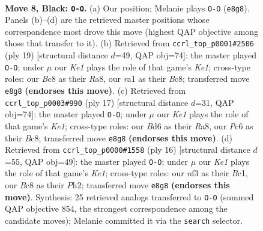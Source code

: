 \documentclass[11pt]{article}
\begin{document}
\begin{figure}[p]\centering
\begin{subfigure}{0.46\textwidth}\centering
\resizebox{\linewidth}{!}{%
\newchessgame
\chessboard[
  setfen={rnbqk2r/pp4pp/2pb1n2/3p1pB1/3P4/5NP1/PP2PPBP/RN1Q1RK1 b kq - 1 8},
  showmover=false,
  pgfstyle=straightmove, color=movearrow, markmove={e8-g8}
]}
\caption{}
\end{subfigure}\hfill
\begin{subfigure}{0.46\textwidth}\centering
\resizebox{\linewidth}{!}{%
\newchessgame
\chessboard[
  setfen={r1bqk2r/1p3ppp/p1n2n2/2bp2B1/8/P4NP1/1PP2PBP/RN1Q1RK1 b kq - 1 10},
  showmover=false,
  pgfstyle=straightmove, color=movearrow, markmove={e8-g8}
]}
\caption{}
\end{subfigure}
\\[4pt]
\begin{subfigure}{0.46\textwidth}\centering
\resizebox{\linewidth}{!}{%
\newchessgame
\chessboard[
  setfen={r1bqk2r/pp3ppp/2nbpn2/6B1/2Pp4/3P1NP1/PP3PBP/RN1Q1RK1 b kq - 2 9},
  showmover=false,
  pgfstyle=straightmove, color=movearrow, markmove={e8-g8}
]}
\caption{}
\end{subfigure}\hfill
\begin{subfigure}{0.46\textwidth}\centering
\resizebox{\linewidth}{!}{%
\newchessgame
\chessboard[
  setfen={rnbq1rk1/pp3ppp/5n2/3p4/1b1P4/2NB1N2/PP3PPP/R1BQK2R w KQ - 2 9},
  showmover=false,
  pgfstyle=straightmove, color=movearrow, markmove={e1-g1}
]}
\caption{}
\end{subfigure}
\caption{\textbf{Move 8, Black: \texttt{O-O}.} (a) Our position; Melanie plays \texttt{O-O} (\texttt{e8g8}). Panels (b)--(d) are the retrieved master positions whose correspondence most drove this move (highest QAP objective among those that transfer to it). (b) Retrieved from \texttt{ccrl\_top\_p0001\#2506} (ply 19) [structural distance $d$=49, QAP obj=74]: the master played \texttt{O-O}; under $\mu$ our \emph{Ke1} plays the role of that game's \emph{Ke1}; cross-type roles: our \emph{B}c8 as their \emph{R}a8, our \emph{r}a1 as their \emph{B}c8; transferred move \texttt{e8g8} \textbf{(endorses this move)}. (c) Retrieved from \texttt{ccrl\_top\_p0003\#990} (ply 17) [structural distance $d$=31, QAP obj=74]: the master played \texttt{O-O}; under $\mu$ our \emph{Ke1} plays the role of that game's \emph{Ke1}; cross-type roles: our \emph{B}d6 as their \emph{R}a8, our \emph{P}c6 as their \emph{B}c8; transferred move \texttt{e8g8} \textbf{(endorses this move)}. (d) Retrieved from \texttt{ccrl\_top\_p0000\#1558} (ply 16) [structural distance $d$=55, QAP obj=49]: the master played \texttt{O-O}; under $\mu$ our \emph{Ke1} plays the role of that game's \emph{Ke1}; cross-type roles: our \emph{n}f3 as their \emph{B}c1, our \emph{B}c8 as their \emph{P}h2; transferred move \texttt{e8g8} \textbf{(endorses this move)}. Synthesis: 25 retrieved analogs transferred to \texttt{O-O} (summed QAP objective 854, the strongest correspondence among the candidate moves); Melanie committed it via the \texttt{search} selector.}
\label{fig:thought-m15}
\end{figure}
\end{document}
